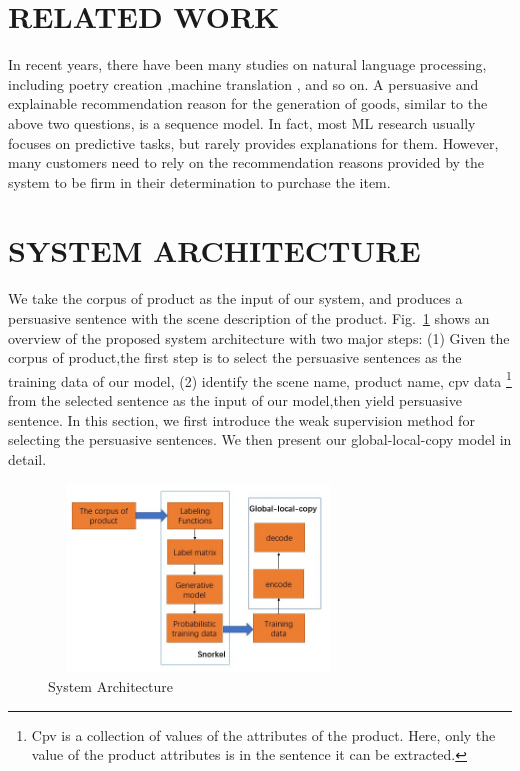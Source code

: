 \documentclass[sigconf]{acmart}
\begin{document}
\section{RELATED WORK}\label{sec:related}
In recent years, there have been many studies on natural language processing, including poetry creation \cite{Colton2012Full,Oliveira2015Tra,Ghazvininejad2016Generating,Yi2017Generating,Zhang2014Chinese,wang2016chinese},machine translation \cite{Kalchbrenner2016Neural,Zhou2016Deep,Wu2016Google}, and so on. A persuasive and explainable recommendation reason for the generation of goods, similar to the above two questions, is a sequence model. In fact, most ML research usually focuses on predictive tasks, but rarely provides explanations for them. However, many customers need to rely on the recommendation reasons provided by the system to be firm in their determination to purchase the item.


\section{SYSTEM ARCHITECTURE}\label{sec:architecture}
We take the corpus of product as the input of our system, and produces a persuasive sentence with the scene description of the product. Fig.~\ref{fig:system-architecture} shows an overview of the proposed system architecture with two major steps: (1) Given the corpus of product,the first step is to select the persuasive sentences as the training data of our model, (2) identify the scene name, product name, cpv data \footnote{Cpv is a collection of values of the attributes of the product. Here, only the value of the product attributes is in the sentence it can be extracted.} from the selected sentence as the input of our model,then yield persuasive sentence. In this section, we first introduce the weak supervision method for selecting the persuasive sentences. We then present our global-local-copy model in detail.  

\begin{figure}
    \centering
    \includegraphics[width=8cm,height=5cm]{system-architecture.jpg}
\caption{System Architecture}\label{fig:system-architecture}
\end{figure}
\end{document}
